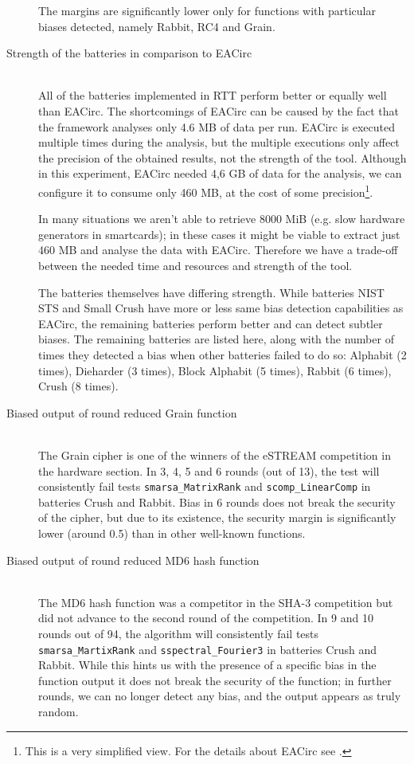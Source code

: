 \documentclass[
	digital,    %
	oneside,    %
	color,
	11pt,
	nocover,
	notable,
	nolof,
	nolot,
]{fithesis3}
\theoremstyle{definition}
\theoremstyle{remark}
\begin{document}
\begin{description}
The margins are significantly lower only for functions with particular biases detected, namely Rabbit, RC4 and Grain.

\item[Strength of the batteries in comparison to EACirc] \hfill \\
All of the batteries implemented in RTT perform better or equally well than EACirc. The shortcomings of EACirc can be caused by the fact that the framework analyses only 4.6 MB of data per run. EACirc is executed multiple times during the analysis, but the multiple executions only affect the precision of the obtained results, not the strength of the tool. Although in this experiment, EACirc needed 4,6 GB of data for the analysis, we can configure it to consume only 460 MB, at the cost of some precision\footnote{This is a very simplified view. For the details about EACirc see \cite{kubicek-dp}.}. 

In many situations we aren't able to retrieve 8000 MiB (e.g. slow hardware generators in smartcards); in these cases it might be viable to extract just 460 MB and analyse the data with EACirc. Therefore we have a trade-off between the needed time and resources and strength of the tool.

The batteries themselves have differing strength. While batteries NIST STS and Small Crush have more or less same bias detection capabilities as EACirc, the remaining batteries perform better and can detect subtler biases. The remaining batteries are listed here, along with the number of times they detected a bias when other batteries failed to do so: Alphabit (2 times), Dieharder (3 times), Block Alphabit (5 times), Rabbit (6 times), Crush (8 times).

\item[Biased output of round reduced Grain function] \hfill \\
The Grain cipher \cite{grain} is one of the winners of the eSTREAM competition in the hardware section. In 3, 4, 5 and 6 rounds (out of 13), the test will consistently fail tests \texttt{smarsa\_MatrixRank} and \texttt{scomp\_LinearComp} in batteries Crush and Rabbit.  Bias in 6 rounds does not break the security of the cipher, but due to its existence, the security margin is significantly lower (around 0.5) than in other well-known functions. 

\item[Biased output of round reduced MD6 hash function] \hfill \\
The MD6 hash function \cite{md6} was a competitor in the SHA-3 competition but did not advance to the second round of the competition. In 9 and 10 rounds out of 94, the algorithm will consistently fail tests \texttt{smarsa\_MartixRank} and \texttt{sspectral\_Fourier3} in batteries Crush and Rabbit. While this hints us with the presence of a specific bias in the function output it does not break the security of the function; in further rounds, we can no longer detect any bias, and the output appears as truly random.

\end{description}
\end{document}
